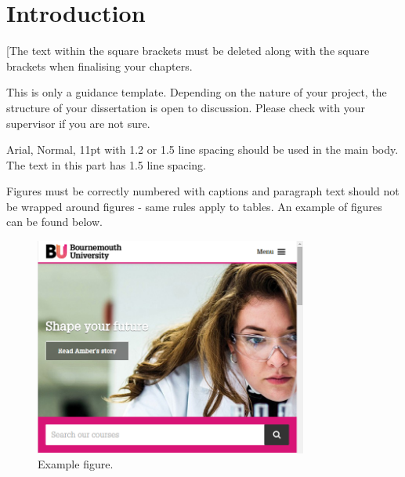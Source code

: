 \titleformat{\chapter}[hang]
	{\normalfont\Huge\bfseries}{\thechapter\quad}{0pt}{\Huge\uppercase}
\titlespacing*{\chapter}{0pt}{0pt}{20pt}


\chapter{Introduction}
\thispagestyle{fancy} %
\label{chap:intro}

[The text within the square brackets must be deleted along with the square brackets when finalising your chapters. 

This is only a guidance template. Depending on the nature of your project, the structure of your dissertation is open to discussion. Please check with your supervisor if you are not sure. 

Arial, Normal, 11pt with 1.2 or 1.5 line spacing should be used in the main body. The text in this part has 1.5 line spacing. 

Figures must be correctly numbered with captions and paragraph text should not be wrapped around figures - same rules apply to tables. An example of figures can be found below.


\begin{figure}[h]
	\centering	
	\includegraphics[width=0.8\textwidth]{images/figtest.png}
	\caption{Example figure.}
	\label{fig:test1}	
\end{figure}



